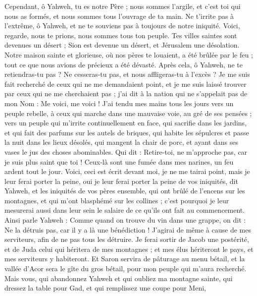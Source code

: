 \begin{multicols}{2}
Cependant, ô Yahweh, tu es notre Père ; nous sommes l'argile, et c'est toi qui nous as formés, et nous sommes tous l'ouvrage de ta main.
Ne t'irrite pas à l'extrême, ô Yahweh, et ne te souviens pas à toujours de notre iniquité. Voici, regarde, nous te prions, nous sommes tous ton peuple.
Tes villes saintes sont devenues un désert ; Sion est devenue un désert, et Jérusalem une désolation.
Notre maison sainte et glorieuse, où nos pères te louaient, a été brûlée par le feu ; tout ce que nous avions de précieux a été dévasté.
Après cela, ô Yahweh, ne te retiendras-tu pas ? Ne cesseras-tu pas, et nous affligeras-tu à l'excès ?
\VerseOne{}Je me suis fait recherché de ceux qui ne me demandaient point, et je me suis laissé trouver par ceux qui ne me cherchaient pas ; j'ai dit à la nation qui ne s'appelait pas de mon Nom : Me voici, me voici !
J'ai tendu mes mains tous les jours vers un peuple rebelle, à ceux qui marche dans une mauvaise voie, au gré de ses pensées ;
vers un peuple qui m'irrite continuellement en face, qui sacrifie dans les jardins, et qui fait des parfums sur les autels de briques,
qui habite les sépulcres et passe la nuit dans les lieux désolés, qui mangent la chair de porc, et ayant dans ses vases le jus des choses abominables.
Qui dit : Retire-toi, ne m'approche pas, car je suis plus saint que toi ! Ceux-là sont une fumée dans mes narines, un feu ardent tout le jour.
Voici, ceci est écrit devant moi, je ne me tairai point, mais je leur ferai porter la peine, oui je leur ferai porter la peine
de vos iniquités, dit Yahweh, et les iniquités de vos pères ensemble, qui ont brûlé de l'encens sur les montagnes, et qui m'ont blasphémé sur les collines ; c'est pourquoi je leur mesurerai aussi dans leur sein le salaire de ce qu'ils ont fait au commencement.
Ainsi parle Yahweh : Comme quand on trouve du vin dans une grappe, on dit : Ne la détruis pas, car il y a là une bénédiction ! J'agirai de même à cause de mes serviteurs, afin de ne pas tous les détruire.
Je ferai sortir de Jacob une postérité, et de Juda celui qui héritera de mes montagnes ; et mes élus hériteront le pays, et mes serviteurs y habiteront.
Et Saron servira de pâturage au menu bétail, et la vallée d'Acor sera le gîte du gros bétail, pour mon peuple qui m'aura recherché.
Mais vous, qui abandonnez Yahweh et qui oubliez ma montagne sainte, qui dressez la table pour Gad, et qui remplissez une coupe pour Meni,

\end{multicols}
